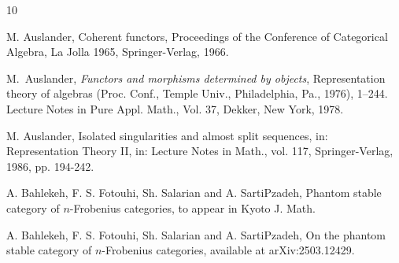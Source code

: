 \documentclass[11pt,a4paper]{amsart}
\def\Ext{\operatorname{{\mathsf{Ext}}}}
\def\Tor{\operatorname{\mathsf{Tor}}}
\theoremstyle{definition}
\theoremstyle{plain}
\theoremstyle{definition}
\numberwithin{equation}{section}
\begin{document}

\begin{thebibliography}{10}

{\sc M. Auslander}, Coherent functors,  Proceedings of the Conference of Categorical
Algebra, La Jolla 1965, Springer-Verlag, 1966.

{\sc M.~Auslander}, {\em Functors and morphisms determined by objects}, Representation theory of algebras
(Proc. Conf., Temple Univ., Philadelphia, Pa., 1976),  1–244. Lecture Notes in Pure Appl.
Math., Vol. 37, Dekker, New York, 1978.

{\sc M. Auslander}, Isolated singularities and almost split sequences, in: Representation Theory II, in: Lecture Notes in Math., vol. 117, Springer-Verlag, 1986, pp. 194-242.


{\sc A. Bahlekeh, F. S. Fotouhi,  Sh. Salarian and A. SartiPzadeh}, Phantom stable category of $n$-Frobenius categories, to appear in Kyoto J. Math.

{\sc A. Bahlekeh, F. S. Fotouhi,  Sh. Salarian and A. SartiPzadeh}, On the  phantom stable category of $n$-Frobenius categories, available at arXiv:2503.12429.









\end{thebibliography}
\end{document}
